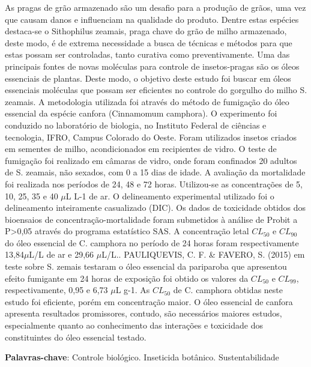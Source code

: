 \documentclass[article,12pt,onesidea,4paper,english,brazil]{abntex2}
\begin{document}
	\noindent 
	As pragas de grão armazenado são um desafio para a produção de grãos, uma vez que causam danos e influenciam na qualidade do produto. Dentre estas espécies destaca-se o Sithophilus zeamais, praga chave do grão de milho armazenado, deste modo, é de extrema necessidade a busca de técnicas e métodos para que estas possam ser controladas, tanto curativa como preventivamente. Uma das principais fontes de novas moléculas para controle de insetos-pragas são os óleos essenciais de plantas. Deste modo, o objetivo deste estudo foi buscar em óleos essenciais moléculas que possam ser eficientes no controle do gorgulho do milho S. zeamais. A metodologia utilizada foi através do método de fumigação do óleo essencial da espécie canfora (Cinnamomum camphora). O experimento foi conduzido no laboratório de biologia, no Instituto Federal de ciências e tecnologia, IFRO, Campus Colorado do Oeste. Foram utilizados insetos criados em sementes de milho, acondicionados em recipientes de vidro. O teste de fumigação foi realizado em câmaras de vidro, onde foram confinados 20 adultos de S. zeamais, não sexados, com 0 a 15 dias de idade. A avaliação da mortalidade foi realizada nos períodos de 24, 48 e 72 horas. Utilizou-se as concentrações de 5, 10, 25, 35 e 40 $\mu$L L-1 de ar. O delineamento experimental utilizado foi o delineamento inteiramente casualizado (DIC). Os dados de toxicidade obtidos dos bioensaios de concentração-mortalidade foram submetidos à análise de Probit a P>0,05 através do programa estatístico SAS. A concentração letal $CL_{50}$ e $CL_{90}$ do óleo essencial de C. camphora no período de 24 horas foram respectivamente 13,84$\mu$L/L de ar e 29,66 $\mu$L/L.. PAULIQUEVIS, C. F. \& FAVERO, S. (2015) em teste sobre S. zemais testaram o óleo essencial da pariparoba que apresentou efeito fumigante em 24 horas de exposição foi obtido os valores da $CL_{50}$ e $CL_{99}$, respectivamente, 0,95 e 6,73 $\mu$L g-1. As $CL_{50}$ de C. camphora obtidas neste estudo foi eficiente, porém em concentração maior. O óleo essencial de canfora apresenta resultados promissores, contudo, são necessários maiores estudos, especialmente quanto ao conhecimento das interações e toxicidade dos constituintes do óleo essencial testado.
	\vspace{\onelineskip}
	
	\noindent
	\textbf{Palavras-chave}: Controle biológico. Inseticida botânico. Sustentabilidade
	
\end{document}
